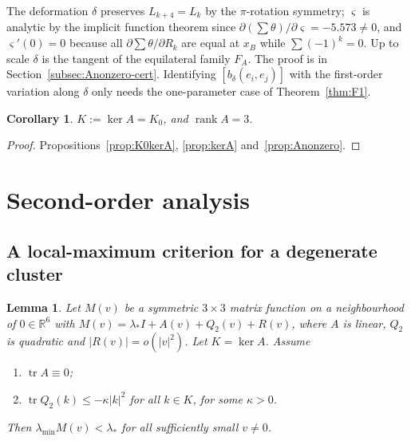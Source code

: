 \documentclass[11pt]{amsart}
\newtheorem{lemma}[theorem]{Lemma}
\newtheorem{corollary}[theorem]{Corollary}
\theoremstyle{definition}
\theoremstyle{remark}
\newcommand{\R}{\mathbb{R}}
\newcommand{\tr}{\operatorname{tr}}
\newcommand{\rank}{\operatorname{rank}}
\newcommand{\ls}{\lambda_*}
\newcommand{\xB}{x_B}
\newcommand{\FA}{F_A}
\begin{document}
The deformation $\delta$ preserves $L_{k+4}=L_k$ by the $\pi$-rotation symmetry; $\varsigma$ is
analytic by the implicit function theorem since $\partial(\sum\theta)/\partial\varsigma=-5.573\ne0$, and
$\varsigma'(0)=0$ because all $\partial\sum\theta/\partial R_k$ are equal at $\xB$ while
$\sum(-1)^k=0$. Up to scale $\delta$ is the tangent of the equilateral family $\FA$. The proof is
in Section~\ref{subsec:Anonzero-cert}. Identifying $[b_\delta(e_i,e_j)]$ with the first-order
variation along $\delta$ only needs the one-parameter case of Theorem~\ref{thm:F1}.

\begin{corollary}\label{cor:rank}
$K:=\ker A=K_0$, and $\rank A=3$.
\end{corollary}

\begin{proof}
Propositions~\ref{prop:K0kerA}, \ref{prop:kerA} and~\ref{prop:Anonzero}.
\end{proof}

\section{Second-order analysis}\label{sec:second}

\subsection{A local-maximum criterion for a degenerate cluster}

\begin{lemma}\label{lem:criterion}
Let $M(v)$ be a symmetric $3\times3$ matrix function on a neighbourhood of $0\in\R^6$ with
$M(v)=\ls I+A(v)+Q_2(v)+R(v)$, where $A$ is linear, $Q_2$ is quadratic and $|R(v)|=o(|v|^2)$.
Let $K=\ker A$. Assume
\begin{enumerate}[label=\textup{(\alph*)}]
\item $\tr A\equiv0$;
\item $\tr Q_2(k)\le-\kappa|k|^2$ for all $k\in K$, for some $\kappa>0$.
\end{enumerate}
Then $\lambda_{\min}M(v)<\ls$ for all sufficiently small $v\ne0$.
\end{lemma}
\end{document}
